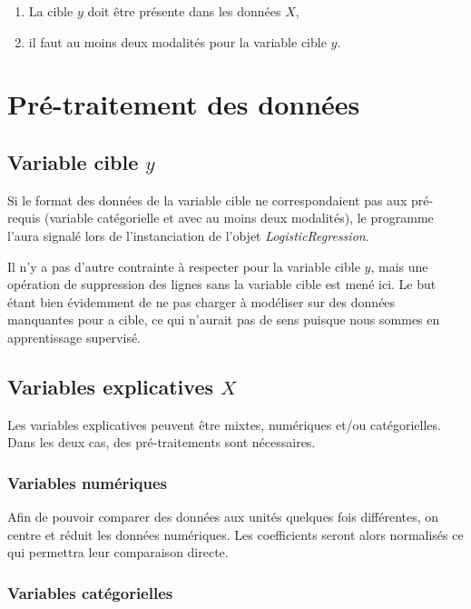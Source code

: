 \documentclass[10pt,french]{report}
\begin{document}
	\begin{enumerate}
		\item La cible $y$ doit être présente dans les données $X$,
		\item il faut au moins deux modalités pour la variable cible $y$.
	\end{enumerate}

	\section{Pré-traitement des données}

	\subsection{Variable cible $y$}

	Si le format des données de la variable cible ne correspondaient pas aux pré-requis (variable catégorielle et avec au moins deux modalités), le programme l'aura signalé lors de l'instanciation de l'objet \textit{LogisticRegression}.

	Il n'y a pas d'autre contrainte à respecter pour la variable cible $y$, mais une opération de suppression des lignes sans la variable cible est mené ici. Le but étant bien évidemment de ne pas charger à modéliser sur des données manquantes pour a cible, ce qui n'aurait pas de sens puisque nous sommes en apprentissage supervisé.

	\subsection{Variables explicatives $X$}

	Les variables explicatives peuvent être mixtes, numériques et/ou catégorielles. Dans les deux cas, des pré-traitements sont nécessaires.

	\subsubsection{Variables numériques}

	Afin de pouvoir comparer des données aux unités quelques fois différentes, on centre et réduit les données numériques. Les coefficients seront alors normalisés ce qui permettra leur comparaison directe.

	\subsubsection{Variables catégorielles}
\end{document}
